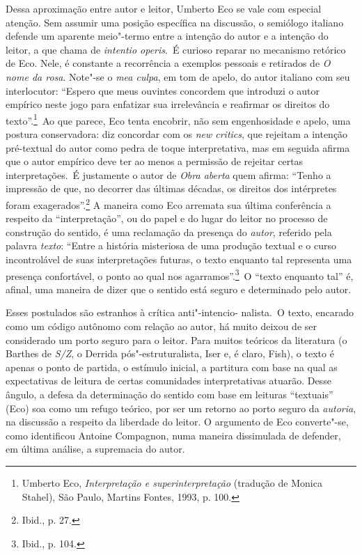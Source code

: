 Dessa aproximação entre autor e leitor, Umberto Eco se vale com especial
atenção. Sem assumir uma posição específica na discussão, o semiólogo
italiano defende um aparente meio"-termo entre a intenção do
autor e a intenção do leitor, a que chama de \emph{intentio
operis}.~É curioso reparar no mecanismo retórico de Eco. Nele, é
constante a recorrência a exemplos pessoais e retirados de \emph{O nome
da rosa}. Note"-se o \emph{mea culpa}, em tom de apelo, do autor italiano
com seu interlocutor: ``Espero que meus ouvintes concordem que introduzi
o autor empírico neste jogo para enfatizar sua irrelevância e reafirmar
os direitos do texto''.\footnote{Umberto Eco, \emph{Interpretação e
  superinterpretação} (tradução de Monica Stahel), São Paulo, Martins
  Fontes, 1993, p. 100.}~Ao que parece, Eco tenta encobrir, não sem
engenhosidade e apelo, uma postura conservadora: diz concordar com
os \emph{new critics}, que rejeitam a intenção pré-textual do autor como
pedra de toque interpretativa, mas em seguida afirma que o autor
empírico deve ter ao menos a permissão de rejeitar certas
interpretações.~É justamente o autor de \emph{Obra aberta} quem afirma:
``Tenho a impressão de que, no decorrer das últimas décadas, os direitos
dos intérpretes foram exagerados''.\footnote{Ibid., p. 27.} A maneira
como Eco arremata sua última conferência a respeito da
``interpretação'', ou do papel e do lugar do leitor no processo de
construção do sentido, é uma reclamação da presença do \emph{autor},
referido pela palavra \emph{texto}: ``Entre a história misteriosa de uma
produção textual e o curso incontrolável de suas interpretações futuras,
o texto enquanto tal representa uma presença confortável, o ponto ao
qual nos agarramos''.\footnote{Ibid., p. 104.}~O ``texto enquanto tal''
é, afinal, uma maneira de dizer que o sentido está seguro e determinado
pelo autor.

Esses postulados são estranhos à crítica anti"-intencio- nalista.~O texto, encarado como um código autônomo com relação ao autor, há muito deixou de ser considerado um porto seguro para o leitor. Para muitos
teóricos da literatura (o Barthes de \emph{S/Z}, o Derrida
pós"-estruturalista, Iser e, é claro, Fish), o texto é apenas o ponto de
partida, o estímulo inicial, a partitura com base na qual as
expectativas de leitura de certas comunidades interpretativas atuarão.
Desse ângulo, a defesa da determinação do sentido com base em leituras
``textuais'' (Eco) soa como um refugo teórico, por ser um retorno ao
porto seguro da \emph{autoria}, na discussão a respeito da liberdade do
leitor. O argumento de Eco converte"-se, como identificou Antoine Compagnon, numa maneira dissimulada de defender, em última análise, a supremacia do autor.

